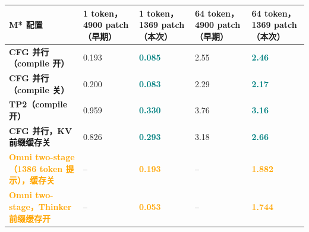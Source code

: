 \begin{tabularx}{\textwidth}{>{\bfseries}p{4.6cm} Y Y Y Y}
\toprule
{}
M* 配置 & 1 token，4900 patch（早期） & 1 token，1369 patch（本次） & 64 token，4900 patch（早期） & 64 token，1369 patch（本次） \\
\midrule
CFG 并行（compile 开） & \textcolor{Muted}{0.193} & \textbf{\textcolor{Teal}{0.085}} & \textcolor{Muted}{2.55} & \textbf{\textcolor{Teal}{2.46}} \\
CFG 并行（compile 关） & \textcolor{Muted}{0.200} & \textbf{\textcolor{Teal}{0.083}} & \textcolor{Muted}{2.29} & \textbf{\textcolor{Teal}{2.17}} \\
TP2（compile 开） & \textcolor{Muted}{0.959} & \textbf{\textcolor{Teal}{0.330}} & \textcolor{Muted}{3.76} & \textbf{\textcolor{Teal}{3.16}} \\
CFG 并行，KV 前缀缓存关 & \textcolor{Muted}{0.826} & \textbf{\textcolor{Teal}{0.293}} & \textcolor{Muted}{3.18} & \textbf{\textcolor{Teal}{2.66}} \\
\midrule
\textcolor{Orange}{Omni two-stage（1386 token 提示），缓存关} & -- & \textbf{\textcolor{Orange}{0.193}} & -- & \textbf{\textcolor{Orange}{1.882}} \\
\textcolor{Orange}{Omni two-stage，Thinker 前缀缓存开} & -- & \textbf{\textcolor{Orange}{0.053}} & -- & \textbf{\textcolor{Orange}{1.744}} \\
\bottomrule
\end{tabularx}
